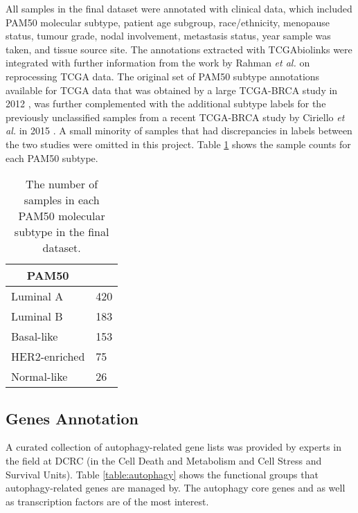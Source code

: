  

    All samples in the final dataset were annotated with clinical data, which included PAM50 molecular subtype, patient age subgroup, race/ethnicity, menopause status, tumour grade, nodal involvement, metastasis status, year sample was taken, and tissue source site. The annotations extracted with TCGAbiolinks were integrated with further information from the work by Rahman \textit{et al. }\cite{RahmanAlternativeResults} on reprocessing TCGA data. 
    The original set of PAM50 subtype annotations available for TCGA data that was obtained by a large TCGA-BRCA study in 2012 \cite{CancerGenomeAtlasNetwork2012ComprehensiveTumours}, was further complemented with the additional subtype labels for the previously unclassified samples from a recent TCGA-BRCA study by Ciriello \textit{et al.} in 2015 \cite{Ciriello2015ComprehensiveCancer}. A small minority of samples that had discrepancies in labels between the two studies were omitted in this project.  Table \ref{table:pam50counts} shows the sample counts for each PAM50 subtype. 
    
    
                \begin{table}[!htbp]
                \centering
                \caption{The number of samples in each PAM50 molecular subtype in the final dataset.}
                \label{table:pam50counts}
                \begin{tabular}{ll}
                \multicolumn{1}{c}{\textbf{PAM50}} &  \\ \hline
                \multicolumn{1}{|l|}{Luminal A} & \multicolumn{1}{l|}{420} \\ \hline
                \multicolumn{1}{|l|}{Luminal B} & \multicolumn{1}{l|}{183} \\ \hline
                \multicolumn{1}{|l|}{Basal-like} & \multicolumn{1}{l|}{153} \\ \hline
                \multicolumn{1}{|l|}{HER2-enriched} & \multicolumn{1}{l|}{75} \\ \hline
                \multicolumn{1}{|l|}{Normal-like} & \multicolumn{1}{l|}{26} \\ \hline
                \end{tabular}
                \end{table}
                

    
    
     \subsection{Genes Annotation}   
    A curated collection of autophagy-related gene lists was provided by experts in the field at DCRC (in the Cell Death and Metabolism and Cell Stress and Survival Units). Table \ref{table:autophagy} shows the functional groups that autophagy-related genes are managed by. The autophagy core genes and as well as transcription factors are of the most interest. 
    
